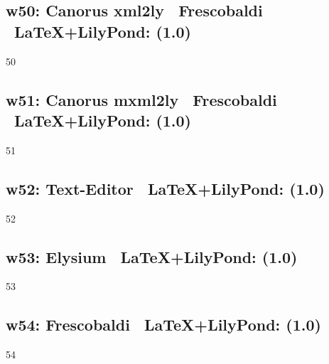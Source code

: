 \subsection{w50: Canorus \ra xml2ly \ra\ Frescobaldi \ra\ \LaTeX+LilyPond: (1.0)}

50

\subsection{w51: Canorus \ra mxml2ly \ra\ Frescobaldi \ra\ \LaTeX+LilyPond: (1.0)}

51

\subsection{w52: Text-Editor \ra\ \LaTeX+LilyPond: (1.0)}

52

\subsection{w53: Elysium \ra\ \LaTeX+LilyPond: (1.0)}

53
\subsection{w54: Frescobaldi \ra\ \LaTeX+LilyPond: (1.0)}

54



